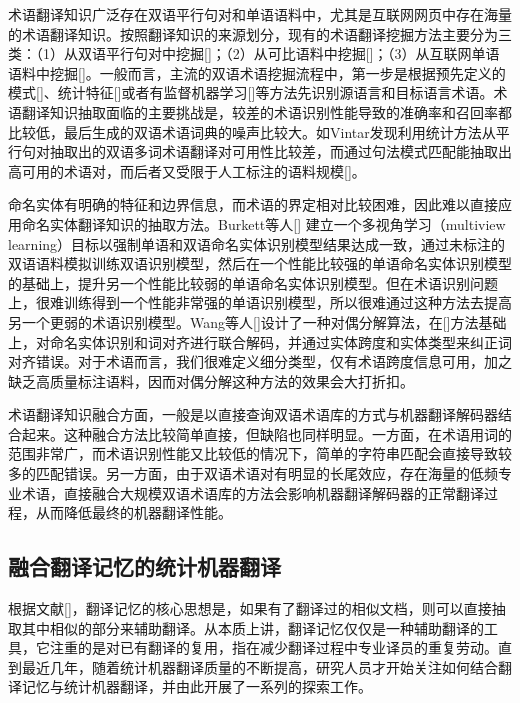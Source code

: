 术语翻译知识广泛存在双语平行句对和单语语料中，尤其是互联网网页中存在海量的术语翻译知识。按照翻译知识的来源划分，现有的术语翻译挖掘方法主要分为三类：（1）从双语平行句对中挖掘[\cite{Fan:2009,LiXiuying:2009}]；（2）从可比语料中挖掘[\cite{Fung:1997}]；（3）从互联网单语语料中挖掘[\cite{Cao:2007,Ren:2010}]。一般而言，主流的双语术语挖掘流程中，第一步是根据预先定义的模式[\cite{Kupiec:1993}]、统计特征[\cite{Lefever:2009}]或者有监督机器学习[\cite{Fan:2009}]等方法先识别源语言和目标语言术语。术语翻译知识抽取面临的主要挑战是，较差的术语识别性能导致的准确率和召回率都比较低，最后生成的双语术语词典的噪声比较大。如Vintar发现利用统计方法从平行句对抽取出的双语多词术语翻译对可用性比较差，而通过句法模式匹配能抽取出高可用的术语对，而后者又受限于人工标注的语料规模[\cite{Vintar:2001}]。

命名实体有明确的特征和边界信息，而术语的界定相对比较困难，因此难以直接应用命名实体翻译知识的抽取方法。Burkett等人[\cite{Burkett:2010a}] 建立一个多视角学习（multiview learning）目标以强制单语和双语命名实体识别模型结果达成一致，通过未标注的双语语料模拟训练双语识别模型，然后在一个性能比较强的单语命名实体识别模型的基础上，提升另一个性能比较弱的单语命名实体识别模型。但在术语识别问题上，很难训练得到一个性能非常强的单语识别模型，所以很难通过这种方法去提高另一个更弱的术语识别模型。Wang等人[\cite{Wang:2013a}]设计了一种对偶分解算法，在[\cite{Martins:2010,Martins:2011,Riedel:2011}]方法基础上，对命名实体识别和词对齐进行联合解码，并通过实体跨度和实体类型来纠正词对齐错误。对于术语而言，我们很难定义细分类型，仅有术语跨度信息可用，加之缺乏高质量标注语料，因而对偶分解这种方法的效果会大打折扣。

术语翻译知识融合方面，一般是以直接查询双语术语库的方式与机器翻译解码器结合起来。这种融合方法比较简单直接，但缺陷也同样明显。一方面，在术语用词的范围非常广，而术语识别性能又比较低的情况下，简单的字符串匹配会直接导致较多的匹配错误。另一方面，由于双语术语对有明显的长尾效应，存在海量的低频专业术语，直接融合大规模双语术语库的方法会影响机器翻译解码器的正常翻译过程，从而降低最终的机器翻译性能。

\subsection{融合翻译记忆的统计机器翻译}

根据文献[\cite{Kay:1980,Somers:2004}]，翻译记忆的核心思想是，如果有了翻译过的相似文档，则可以直接抽取其中相似的部分来辅助翻译。从本质上讲，翻译记忆仅仅是一种辅助翻译的工具，它注重的是对已有翻译的复用，指在减少翻译过程中专业译员的重复劳动。直到最近几年，随着统计机器翻译质量的不断提高，研究人员才开始关注如何结合翻译记忆与统计机器翻译，并由此开展了一系列的探索工作。


